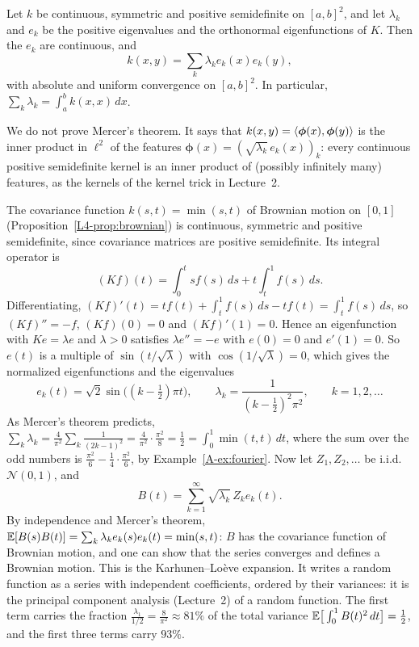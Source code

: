 \begin{theorem}[Mercer]\label{A-thm:mercer}
    Let $k$ be continuous, symmetric and positive semidefinite on $[a, b]^2$, and let $\lambda_k$ and $e_k$ be the positive eigenvalues and the orthonormal eigenfunctions of $K$. Then the $e_k$ are continuous, and
    \[k(x, y) = \sum_k \lambda_ke_k(x)e_k(y),\]
    with absolute and uniform convergence on $[a, b]^2$. In particular, $\sum_k \lambda_k = \int_a^b k(x, x)\, dx$.
\end{theorem}

We do not prove Mercer's theorem. It says that $k(x, y) = \langle \boldsymbol{\phi}(x), \boldsymbol{\phi}(y) \rangle$ is the inner product in $\ell^2$ of the features $\boldsymbol{\phi}(x) = (\sqrt{\lambda_k}\,e_k(x))_k$: every continuous positive semidefinite kernel is an inner product of (possibly infinitely many) features, as the kernels of the kernel trick in Lecture~2.

\begin{example}\label{A-ex:karhunen-loeve}
    The covariance function $k(s, t) = \min(s, t)$ of Brownian motion on $[0, 1]$ (Proposition~\ref{L4-prop:brownian}) is continuous, symmetric and positive semidefinite, since covariance matrices are positive semidefinite. Its integral operator is
    \[(Kf)(t) = \int_0^t sf(s)\, ds + t\int_t^1 f(s)\, ds.\]
    Differentiating, $(Kf)'(t) = tf(t) + \int_t^1 f(s)\, ds - tf(t) = \int_t^1 f(s)\, ds$, so $(Kf)'' = -f$, $(Kf)(0) = 0$ and $(Kf)'(1) = 0$. Hence an eigenfunction with $Ke = \lambda e$ and $\lambda > 0$ satisfies $\lambda e'' = -e$ with $e(0) = 0$ and $e'(1) = 0$. So $e(t)$ is a multiple of $\sin(t/\sqrt{\lambda})$ with $\cos(1/\sqrt{\lambda}) = 0$, which gives the normalized eigenfunctions and the eigenvalues
    \[e_k(t) = \sqrt{2}\sin\big((k - \tfrac{1}{2})\pi t\big), \qquad \lambda_k = \frac{1}{(k - \frac{1}{2})^2\pi^2}, \qquad k = 1, 2, \ldots\]
    As Mercer's theorem predicts, $\sum_k \lambda_k = \frac{4}{\pi^2}\sum_k \frac{1}{(2k - 1)^2} = \frac{4}{\pi^2} \cdot \frac{\pi^2}{8} = \frac{1}{2} = \int_0^1 \min(t, t)\, dt$, where the sum over the odd numbers is $\frac{\pi^2}{6} - \frac{1}{4} \cdot \frac{\pi^2}{6}$, by Example~\ref{A-ex:fourier}. Now let $Z_1, Z_2, \ldots$ be i.i.d.\ $\mathcal{N}(0, 1)$, and
    \[B(t) = \sum_{k=1}^\infty \sqrt{\lambda_k}\,Z_ke_k(t).\]
    By independence and Mercer's theorem, $\mathbb{E}[B(s)B(t)] = \sum_k \lambda_ke_k(s)e_k(t) = \min(s, t)$: $B$ has the covariance function of Brownian motion, and one can show that the series converges and defines a Brownian motion. This is the Karhunen--Lo\`eve expansion. It writes a random function as a series with independent coefficients, ordered by their variances: it is the principal component analysis (Lecture~2) of a random function. The first term carries the fraction $\frac{\lambda_1}{1/2} = \frac{8}{\pi^2} \approx 81\%$ of the total variance $\mathbb{E}\big[\int_0^1 B(t)^2\, dt\big] = \frac{1}{2}$, and the first three terms carry $93\%$.
\end{example}

